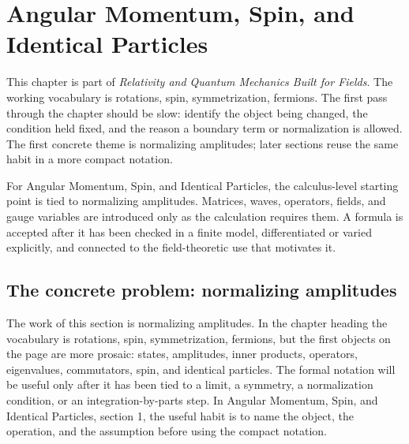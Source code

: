\chapter{Angular Momentum, Spin, and Identical Particles}


This chapter is part of \emph{Relativity and Quantum Mechanics Built for Fields}.  The working vocabulary is rotations, spin, symmetrization, fermions.  The first pass through the chapter should be slow: identify the object being changed, the condition held fixed, and the reason a boundary term or normalization is allowed.  The first concrete theme is normalizing amplitudes; later sections reuse the same habit in a more compact notation.

For Angular Momentum, Spin, and Identical Particles, the calculus-level starting point is tied to normalizing amplitudes.  Matrices, waves, operators, fields, and gauge variables are introduced only as the calculation requires them.  A formula is accepted after it has been checked in a finite model, differentiated or varied explicitly, and connected to the field-theoretic use that motivates it.

\section{The concrete problem: normalizing amplitudes}













The work of this section is normalizing amplitudes.  In the chapter heading the vocabulary is rotations, spin, symmetrization, fermions, but the first objects on the page are more prosaic: states, amplitudes, inner products, operators, eigenvalues, commutators, spin, and identical particles.  The formal notation will be useful only after it has been tied to a limit, a symmetry, a normalization condition, or an integration-by-parts step.  In Angular Momentum, Spin, and Identical Particles, section 1, the useful habit is to name the object, the operation, and the assumption before using the compact notation.

